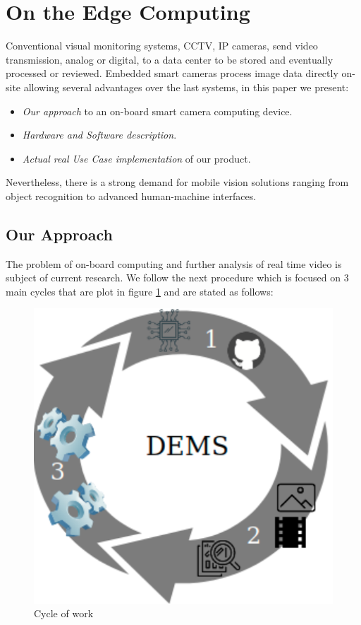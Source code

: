 \section{On the Edge Computing}

Conventional visual monitoring systems, CCTV, IP cameras, send video transmission, analog or digital, to a data center to be stored and eventually processed or reviewed. Embedded smart cameras process image data directly on-site allowing several advantages over the last systems, in this paper we present:

\begin{itemize}[noitemsep] %
\item \textit{Our approach} to an on-board smart camera computing device.
\item \textit{Hardware and Software description}.
\item \textit{Actual real Use Case implementation} of our product. 
\end{itemize}


Nevertheless, there is a strong demand for mobile vision solutions ranging from object recognition to advanced human-machine interfaces.

\subsection{Our Approach}

The problem of on-board computing and further analysis of real time video is subject of current research. We follow the next procedure which is focused on 3 main cycles that are plot in figure \ref{fig:cycle} and are stated as follows:

\begin{figure}[h]\centering
	\includegraphics[width=0.6\linewidth]{images/cycle}
	\caption{Cycle of work}
	\label{fig:cycle}
\end{figure}

